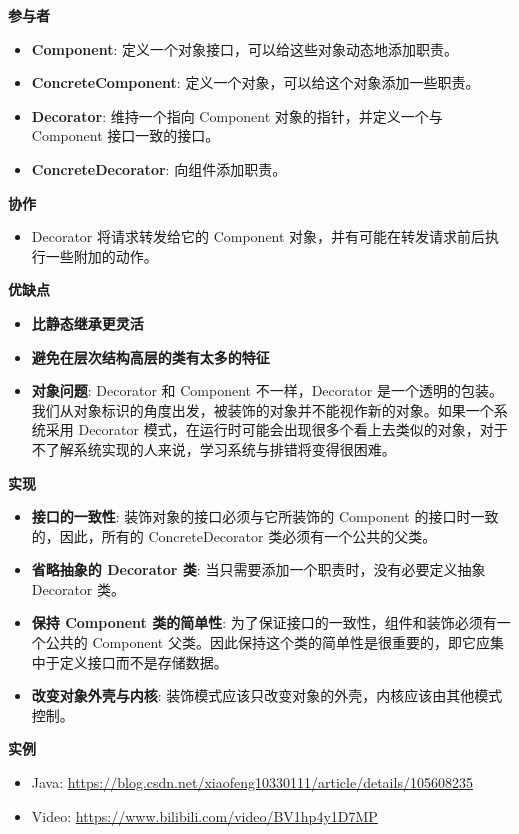 \noindent\textbf{参与者}

\begin{itemize}
    \item \textbf{Component}: 定义一个对象接口，可以给这些对象动态地添加职责。
    \item \textbf{ConcreteComponent}: 定义一个对象，可以给这个对象添加一些职责。
    \item \textbf{Decorator}: 维持一个指向 Component 对象的指针，并定义一个与 Component 接口一致的接口。
    \item \textbf{ConcreteDecorator}: 向组件添加职责。
\end{itemize}

\noindent\textbf{协作}

\begin{itemize}
    \item Decorator 将请求转发给它的 Component 对象，并有可能在转发请求前后执行一些附加的动作。
\end{itemize}

\noindent\textbf{优缺点}

\begin{itemize}
    \item \textbf{比静态继承更灵活}
    \item \textbf{避免在层次结构高层的类有太多的特征}
    \item \textbf{对象问题}: Decorator 和 Component 不一样，Decorator 是一个透明的包装。我们从对象标识的角度出发，被装饰的对象并不能视作新的对象。如果一个系统采用 Decorator 模式，在运行时可能会出现很多个看上去类似的对象，对于不了解系统实现的人来说，学习系统与排错将变得很困难。
\end{itemize}

\noindent\textbf{实现}

\begin{itemize}
    \item \textbf{接口的一致性}: 装饰对象的接口必须与它所装饰的 Component 的接口时一致的，因此，所有的 ConcreteDecorator 类必须有一个公共的父类。
    \item \textbf{省略抽象的 Decorator 类}: 当只需要添加一个职责时，没有必要定义抽象 Decorator 类。
    \item \textbf{保持 Component 类的简单性}: 为了保证接口的一致性，组件和装饰必须有一个公共的 Component 父类。因此保持这个类的简单性是很重要的，即它应集中于定义接口而不是存储数据。
    \item \textbf{改变对象外壳与内核}: 装饰模式应该只改变对象的外壳，内核应该由其他模式控制。
\end{itemize}

\noindent\textbf{实例}

\begin{itemize}
    \item Java: \url{https://blog.csdn.net/xiaofeng10330111/article/details/105608235}
    \item Video: \url{https://www.bilibili.com/video/BV1hp4y1D7MP}
\end{itemize}



\newpage